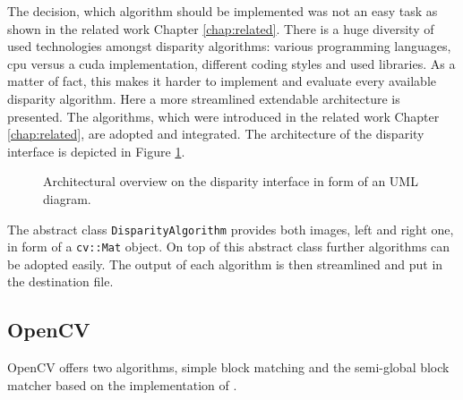 
The decision, which algorithm should be implemented was not an easy task as shown in the related work Chapter \ref{chap:related}.
There is a huge diversity of used technologies amongst disparity algorithms: various programming languages, cpu versus a cuda implementation, different coding styles and used libraries.
As a matter of fact, this makes it harder to implement and evaluate every available disparity algorithm.
Here a more streamlined extendable architecture is presented.
The algorithms, which were introduced in the related work Chapter \ref{chap:related}, are adopted and integrated.
The architecture of the disparity interface is depicted in Figure \ref{fig:uml-disparity-interface}.

\begin{figure}[h!]
  \centering
  \caption{Architectural overview on the disparity interface in form of an UML diagram.}
  \label{fig:uml-disparity-interface}
\end{figure}

\noindent The abstract class \texttt{DisparityAlgorithm} provides both images, left and right one, in form of a \texttt{cv::Mat} object.
On top of this abstract class further algorithms can be adopted easily.
The output of each algorithm is then streamlined and put in the destination file.

\subsection*{OpenCV}

OpenCV offers two algorithms, simple block matching and the semi-global block matcher based on the implementation of \citeauthor{hirschmuller2008stereo}.

